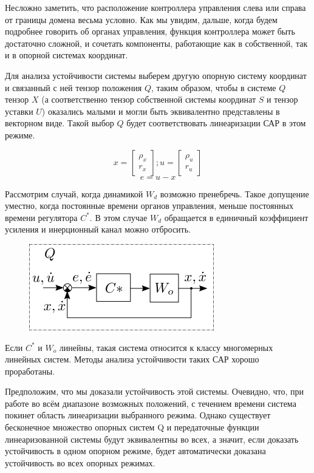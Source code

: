 \documentclass[a4paper]{article}
\begin{document}
Несложно заметить, что расположение контроллера управления слева или справа от границы домена весьма условно. Как мы увидим, дальше, когда будем подробнее говорить об органах управления, функция контроллера может быть достаточно сложной, и сочетать компоненты, работающие как в собственной, так и в опорной системах координат.

Для анализа устойчивости системы выберем другую опорную систему координат и связанный с ней тензор положения $Q$, таким образом, чтобы в системе $Q$ тензор $X$ (а соответственно тензор собственной системы координат $S$ и тензор уставки $U$) оказались малыми и могли быть эквивалентно представлены в векторном виде. Такой выбор $Q$ будет соответствовать линеаризации САР в этом режиме.

\begin{equation}
x = \begin{bmatrix}\rho_x\\r_x\end{bmatrix};  
u = \begin{bmatrix}\rho_u\\r_u\end{bmatrix}
\end{equation}
\begin{equation}
e = u - x
\end{equation}

Рассмотрим случай, когда динамикой $W_d$ возможно пренебречь. Такое допущение уместно, когда постоянные времени органов управления, меньше постоянных времени регулятора $C^*$. В этом случае $W_{d}$ обращается в единичный коэффициент усиления и инерционный канал можно отбросить. 

{
\begin{figure}[H]
\centering
\includegraphics{./src/sheme4.png}
\end{figure}
}

Если $C^*$ и $W_o$ линейны, такая система относится к классу многомерных линейных систем. Методы анализа устойчивости таких САР хорошо проработаны.

Предположим, что мы доказали устойчивость этой системы. Очевидно, что, при работе во всём диапазоне возможных положений, с течением времени система покинет область линеаризации выбранного режима. Однако существует бесконечное множество опорных систем Q и передаточные функции линеаризованной системы будут эквивалентны во всех, а значит, если доказать устойчивость в одном опорном режиме, будет автоматически доказана устойчивость во всех опорных режимах. 
\end{document}
